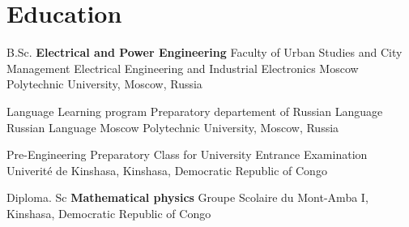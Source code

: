 \section{Education}
                {B.Sc. \textbf{Electrical and Power Engineering}}
                {Faculty of Urban Studies and City Management}
                {Electrical Engineering and Industrial Electronics}
                {Moscow Polytechnic University, Moscow, Russia}{}
        
        \vspace{10pt}    

                {Language Learning program }
                {Preparatory departement of Russian Language}
                {Russian Language}
                {}{Moscow Polytechnic University, Moscow, Russia}
        
        \vspace{10pt}
        
                {Pre-Engineering}
                {Preparatory Class for University Entrance Examination}
                {}{}{Univerité de Kinshasa, Kinshasa, Democratic Republic of Congo}
                
        \vspace{10pt}     

                {Diploma. Sc \textbf{Mathematical physics}}
                {}
                {}{}{Groupe Scolaire du Mont-Amba I, Kinshasa, Democratic Republic of Congo}